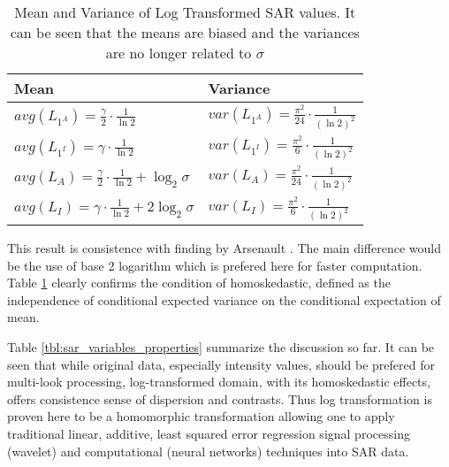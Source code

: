 \documentclass[journal]{IEEEtran}
\begin{document}
\begin{table}[!h]
\caption{ Mean and Variance of Log Transformed SAR values. It can be seen that the means are biased and the variances are no longer related to $\sigma$ }
\label{tbl:sar_log_domain_avg_var}
\normalsize
\centering

\begin{tabular}{|l|l|}
\hline
Mean & Variance \\
\hline
$avg(L_{1^A}) = \frac{ \gamma }{2} \cdot \frac{1}{\ln2}$ & $var(L_{1^A}) = \frac{ \pi ^2}{24} \cdot \frac{1}{(\ln2)^2}$ \\
$avg(L_{1^I}) = \gamma \cdot \frac{1}{\ln2} $ & $var(L_{1^I}) = \frac{ \pi ^2}{6} \cdot \frac{1}{(\ln2)^2} $ \\
$avg(L_A) = \frac{ \gamma }{2} \cdot \frac{1}{\ln2} + \log_2{\sigma}$ & $var(L_A) = \frac{ \pi ^2}{24} \cdot \frac{1}{(\ln2)^2}$ \\
$avg(L_I) = \gamma \cdot \frac{1}{\ln2} + 2 \log_2{\sigma}  $ & $ var(L_I) = \frac{ \pi ^2}{6} \cdot \frac{1}{(\ln2)^2}$ \\
\hline
\end{tabular}

\end{table}

This result is consistence with finding by Arsenault \cite{Arsenault_JOptSocAm_1976}.  The main difference would be the use of base 2 logarithm which is prefered here for faster computation. Table \ref{tbl:sar_log_domain_avg_var} clearly confirms the condition of homoskedastic,  defined as  the independence of conditional expected variance on the conditional expectation of mean. 

Table \ref{tbl:sar_variables_properties} summarize the discussion so far. It can be seen that while original data, especially intensity values, should be prefered for multi-look processing, log-transformed domain, with its homoskedastic effects, offers consistence sense of dispersion and contrasts. Thus log transformation is proven here to be a homomorphic transformation allowing one to apply traditional linear, additive, least squared error regression signal processing (wavelet) and computational (neural networks) techniques into SAR data.
\end{document}
